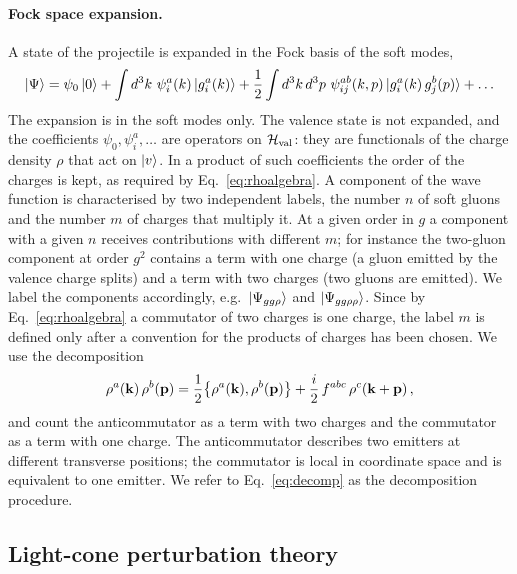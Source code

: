 \paragraph{Fock space expansion.} A state of the projectile is expanded in the Fock basis of the soft modes,
\begin{align}\label{eq:fock}
\ket\Psi=\psi_0\ket0+\int d^3k\ \psi^a_i(k)\ket{g^a_i(k)}+\frac12\int d^3k\,d^3p\ \psi^{ab}_{ij}(k,p)\ket{g^a_i(k)\,g^b_j(p)}+\dots
\end{align}
The expansion is in the soft modes only. The valence state is not expanded, and the coefficients $\psi_0,\psi^a_i,\dots$ are operators on $\mathcal H_{\rm val}$: they are functionals of the charge density $\rho$ that act on $\ket v$. In a product of such coefficients the order of the charges is kept, as required by Eq.~\eqref{eq:rhoalgebra}. A component of the wave function is characterised by two independent labels, the number $n$ of soft gluons and the number $m$ of charges that multiply it. At a given order in $g$ a component with a given $n$ receives contributions with different $m$; for instance the two-gluon component at order $g^2$ contains a term with one charge (a gluon emitted by the valence charge splits) and a term with two charges (two gluons are emitted). We label the components accordingly, e.g.\ $\ket{\Psi_{gg\rho}}$ and $\ket{\Psi_{gg\rho\rho}}$. Since by Eq.~\eqref{eq:rhoalgebra} a commutator of two charges is one charge, the label $m$ is defined only after a convention for the products of charges has been chosen. We use the decomposition
\begin{align}\label{eq:decomp}
\rho^a(\mathbf{k})\,\rho^b(\mathbf{p})=\frac12\big\{\rho^a(\mathbf{k}),\rho^b(\mathbf{p})\big\}+\frac{i}{2}\,f^{abc}\,\rho^c(\mathbf{k}+\mathbf{p})\,,
\end{align}
and count the anticommutator as a term with two charges and the commutator as a term with one charge. The anticommutator describes two emitters at different transverse positions; the commutator is local in coordinate space and is equivalent to one emitter. We refer to Eq.~\eqref{eq:decomp} as the decomposition procedure.

\subsection{Light-cone perturbation theory}\label{sec:lcpt}

